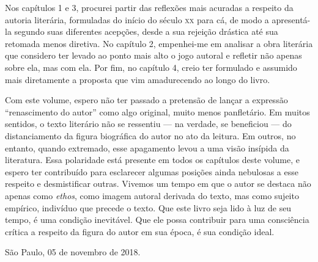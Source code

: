 Nos capítulos 1 e 3, procurei partir das reflexões mais acuradas a respeito da autoria literária, formuladas do início do século \textsc{xx} para cá, de modo a apresentá-la segundo suas diferentes acepções, desde a sua rejeição drástica até sua retomada menos diretiva. No capítulo 2, empenhei-me em analisar a obra literária que considero ter levado ao ponto mais alto o jogo autoral e refletir não apenas sobre ela, mas com ela. Por fim, no capítulo 4, creio ter formulado e assumido mais diretamente a proposta que vim amadurecendo ao longo do livro. 

Com este volume, espero não ter passado a pretensão de lançar a expressão ``renascimento do autor'' como algo original, muito menos panfletário. Em muitos sentidos, o texto literário não se ressentiu --- na verdade, se beneficiou --- do distanciamento da figura biográfica do autor no ato da leitura. Em outros, no entanto, quando extremado, esse apagamento levou a uma visão insípida da literatura. Essa polaridade está presente em todos os capítulos deste volume, e espero ter contribuído para esclarecer algumas posições ainda nebulosas a esse respeito e desmistificar outras. Vivemos um tempo em que o autor se destaca não apenas como \emph{ethos}, como imagem autoral derivada do texto, mas como sujeito empírico, indivíduo que precede o texto. Que este livro seja lido à luz de seu tempo, é uma condição inevitável. Que ele possa contribuir para uma consciência crítica a respeito da figura do autor em sua época, é sua condição ideal. 

\bigskip
\bigskip

\begin{flushright}
São Paulo, 05 de novembro de 2018.
\end{flushright}
